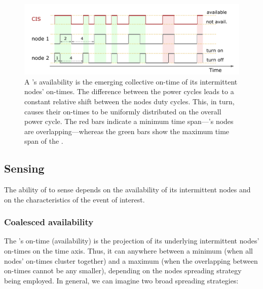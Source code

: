 %
\begin{figure}[t]
		\centering
		\includegraphics[width=\columnwidth]{figures/cisOntime}
		\caption{A \fullsys's availability is the emerging collective on-time of its intermittent nodes' on-times. The difference between the power cycles leads to a constant relative shift between the nodes duty cycles. This, in turn, causes their on-times to be uniformly distributed on the overall power cycle. The red bars indicate a minimum \sys time span---\sys's nodes are overlapping---whereas the green bars show the maximum time span of the \sys.}
		\label{fig:cisOntime}
\end{figure} 
%
\subsection{Sensing}

The ability of \sys to sense depends on the availability of its intermittent nodes and on the characteristics of the event of interest. 

\subsubsection{Coalesced availability}
\label{subSec:availability}
%
The \sys's on-time (availability) is the projection of its underlying intermittent nodes' on-times on the time axis. Thus, it can anywhere between a minimum (when all nodes' on-times cluster together) and a maximum (when the overlapping between on-times cannot be any smaller), depending on the nodes spreading strategy being employed.
%
In general, we can imagine two broad spreading strategies:

